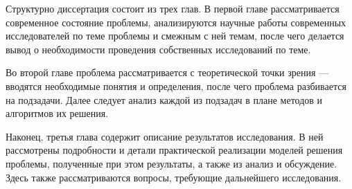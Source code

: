 Структурно диссертация состоит из трех глав. В первой главе рассматривается современное состояние проблемы, анализируются
научные работы современных исследователей по теме проблемы и смежным с ней темам, после чего делается вывод о необходимости
проведения собственных исследований по теме. 

Во второй главе проблема рассматривается с теоретической точки зрения --- вводятся необходимые понятия и определения, после чего 
проблема разбивается на подзадачи. Далее следует анализ каждой из подзадач в плане методов и алгоритмов их решения.

Наконец, третья глава содержит описание результатов исследования. В ней рассмотрены подробности и детали практической реализации
моделей решения проблемы, полученные при этом результаты, а также из анализ и обсуждение. Здесь также рассматриваются вопросы,
требующие дальнейшего исследования.
